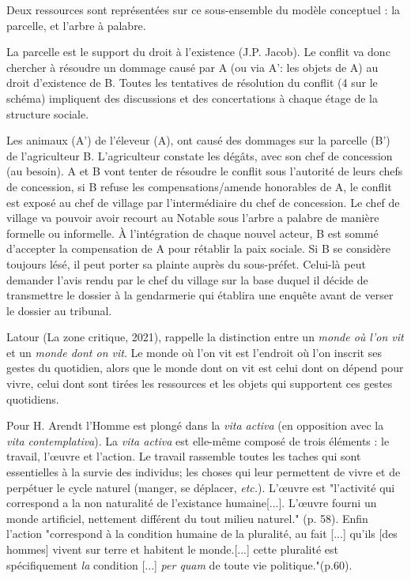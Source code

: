 Deux ressources sont représentées sur ce sous-ensemble du modèle conceptuel : la parcelle, et l'arbre à palabre.

La parcelle est le support du droit à l'existence (J.P. Jacob). Le conflit va donc chercher à résoudre un dommage causé par A (ou via A': les objets de A) au droit d'existence de B. Toutes les tentatives de résolution du conflit (4 sur le schéma) impliquent des discussions et des concertations à chaque étage de la structure sociale.

Les animaux (A') de l'éleveur (A), ont causé des dommages sur la parcelle (B') de l'agriculteur B. L'agriculteur constate les dégâts, avec son chef de concession (au besoin). A et B vont tenter de résoudre le conflit sous l'autorité de leurs chefs de concession, si B refuse les compensations/amende honorables de A, le conflit est exposé au chef de village par l'intermédiaire du chef de concession. Le chef de village va pouvoir avoir recourt au Notable sous l'arbre a palabre de manière formelle ou informelle. À l'intégration de chaque nouvel acteur, B est sommé d'accepter la compensation de A pour rétablir la paix sociale. Si B se considère toujours lésé, il peut porter sa plainte auprès du sous-préfet. Celui-là peut demander l'avis rendu par le chef du village sur la base duquel il décide de transmettre le dossier à la gendarmerie qui établira une enquête avant de verser le dossier au tribunal.

Latour (La zone critique, 2021), rappelle la distinction entre  un \textit{monde où l'on vit} et un \textit{monde dont on vit}. Le monde où l'on vit  est l'endroit où l'on inscrit ses gestes du quotidien, alors que le monde dont on vit est  celui dont on dépend pour vivre, celui dont sont tirées les ressources et les objets qui supportent ces gestes quotidiens.

Pour H. Arendt\cite{arendt_condition_2020} l'Homme est plongé dans la \textit{vita activa} (en opposition avec la \textit{vita contemplativa}). La \textit{vita activa} est elle-même composé de trois éléments : le travail, l'\oe{}uvre et l'action. Le travail rassemble toutes les taches qui sont essentielles à la survie des individus; les choses qui leur permettent de vivre et de perpétuer le cycle naturel (manger, se déplacer, \textit{etc.}). L'\oe{}uvre est "l'activité qui correspond a la non naturalité de l'existance humaine[...]. L'\oe{}uvre fourni un monde artificiel, nettement différent du tout milieu naturel." (p. 58). Enfin l'action "correspond à la condition humaine de la pluralité, au fait [...] qu'ils [des hommes] vivent sur terre et habitent le monde.[...] cette pluralité est spécifiquement \textit{la} condition [...] \textit{per quam} de toute vie politique."(p.60).

